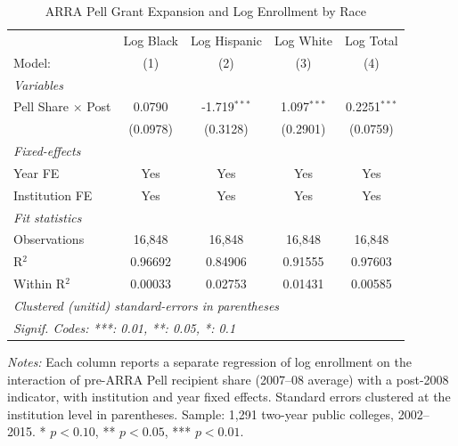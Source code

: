 
\begin{table}[htbp]
   \caption{\label{tab:main} ARRA Pell Grant Expansion and Log Enrollment by Race}
   \centering
   \begin{tabular}{lcccc}
      \tabularnewline \midrule \midrule
                                & Log Black & Log Hispanic   & Log White     & Log Total \\   
      Model:                    & (1)       & (2)            & (3)           & (4)\\  
      \midrule
      \emph{Variables}\\
      Pell Share $\times$ Post  & 0.0790    & -1.719$^{***}$ & 1.097$^{***}$ & 0.2251$^{***}$\\   
                                & (0.0978)  & (0.3128)       & (0.2901)      & (0.0759)\\   
      \midrule
      \emph{Fixed-effects}\\
      Year FE                   & Yes       & Yes            & Yes           & Yes\\  
      Institution FE            & Yes       & Yes            & Yes           & Yes\\  
      \midrule
      \emph{Fit statistics}\\
      Observations              & 16,848    & 16,848         & 16,848        & 16,848\\  
      R$^2$                     & 0.96692   & 0.84906        & 0.91555       & 0.97603\\  
      Within R$^2$              & 0.00033   & 0.02753        & 0.01431       & 0.00585\\  
      \midrule \midrule
      \multicolumn{5}{l}{\emph{Clustered (unitid) standard-errors in parentheses}}\\
      \multicolumn{5}{l}{\emph{Signif. Codes: ***: 0.01, **: 0.05, *: 0.1}}\\
   \end{tabular}
   
   \par\vspace{0.3em}\begin{minipage}{\textwidth}\small 
   \textit{Notes:} Each column reports a separate regression of log enrollment on the interaction of pre-ARRA Pell recipient share (2007--08 average) with a post-2008 indicator, with institution and year fixed effects. Standard errors clustered at the institution level in parentheses. Sample: 1,291 two-year public colleges, 2002--2015. * $p<0.10$, ** $p<0.05$, *** $p<0.01$.
\end{minipage}
\end{table}


